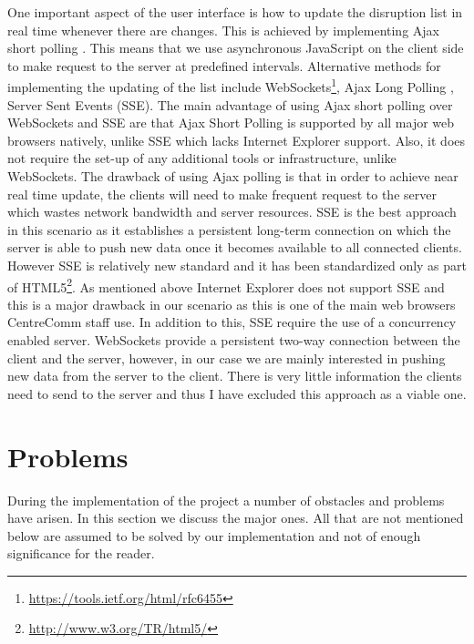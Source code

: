 
One important aspect of the user interface is how to update the disruption list in real time whenever there are changes. This is achieved by implementing Ajax short polling \cite{bozdag2007comparison}. This means that we use asynchronous JavaScript on the client side to make request to the server at predefined intervals. Alternative methods for implementing the updating of the list include WebSockets\footnote{\url{https://tools.ietf.org/html/rfc6455}}, Ajax Long Polling \cite{bozdag2007comparison}, Server Sent Events (SSE)\cite{serverSentEvents}. The main advantage of using Ajax short polling over WebSockets and SSE are that Ajax Short Polling is supported by all major web browsers natively, unlike SSE which lacks Internet Explorer support. Also, it does not require the set-up of any additional tools or infrastructure, unlike WebSockets. The drawback of using Ajax polling is that in order to achieve near real time update, the clients will need to make frequent request to the server which wastes network bandwidth and server resources. SSE is the best approach in this scenario as it establishes a persistent long-term connection on which the server is able to push new data once it becomes available to all connected clients. However SSE is relatively new standard and it has been standardized only as part of HTML5\footnote{\url{http://www.w3.org/TR/html5/}}. As mentioned above Internet Explorer does not support SSE and this is a major drawback in our scenario as this is one of the main web browsers CentreComm staff use. In addition to this, SSE require the use of a concurrency enabled server. WebSockets provide a persistent two-way connection between the client and the server, however, in our case we are mainly interested in pushing new data from the server to the client. There is very little information the clients need to send to the server and thus I have excluded this approach as a viable one.

\section{Problems}
During the implementation of the project a number of obstacles and problems have arisen. In this section we discuss the major ones. All that are not mentioned below are assumed to be solved by our implementation and not of enough significance for the reader.

